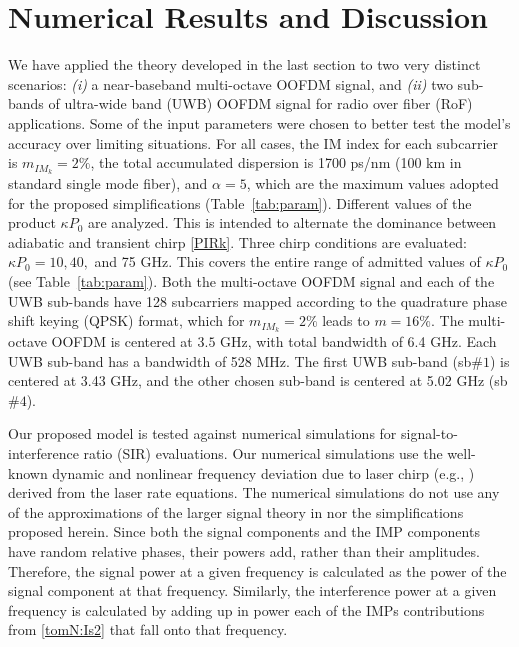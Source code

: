 \documentclass[journal]{IEEEtran}
\begin{document}
\section{Numerical Results and Discussion} \label{sec:results}
We have applied the theory developed in the last section to two very distinct scenarios: \emph{(i)} a near-baseband multi-octave OOFDM signal, and \emph{(ii)} two sub-bands of ultra-wide band (UWB) OOFDM signal for radio over fiber (RoF) applications. Some of the input parameters were chosen to better test the model's accuracy over limiting situations. For all cases, the IM index for each subcarrier is $m_{IM_k} = 2\%$, the total accumulated dispersion is 1700 ps/nm (100 km in standard single mode fiber), and $\alpha = 5$, which are the maximum values adopted for the proposed simplifications (Table~\ref{tab:param}). Different values of the product $\kappa P_0$ are analyzed. This is intended to alternate the dominance between adiabatic and transient chirp \eqref{PIRk}. Three chirp conditions are evaluated: $\kappa P_0 = 10, 40,$ and 75 GHz. This covers the entire range of admitted values of $\kappa P_0$ (see Table~\ref{tab:param}). Both the multi-octave OOFDM signal and each of the UWB sub-bands have 128 subcarriers mapped according to the quadrature phase shift keying (QPSK) format, which for $m_{IM_k} = 2\%$ leads to $m = 16\%$. The multi-octave OOFDM is centered at $3.5$ GHz, with total bandwidth of 6.4 GHz. Each UWB sub-band has a bandwidth of 528 MHz. The first UWB sub-band (sb$\#1$) is centered at 3.43 GHz, and the other chosen sub-band is centered at 5.02 GHz (sb$\#4$). 

Our proposed model is tested against numerical simulations for signal-to-interference ratio (SIR) evaluations. Our numerical simulations use the well-known dynamic and nonlinear frequency deviation due to laser chirp (e.g., \cite[eq. (3)]{equalization}) derived from the laser rate equations. The numerical simulations do not use any of the approximations of the larger signal theory in \cite{eva} nor the simplifications proposed herein. Since both the signal components and the IMP components have random relative phases, their powers add, rather than their amplitudes. Therefore, the signal power at a given frequency is calculated as the power of the signal component at that frequency. Similarly, the interference power at a given frequency is calculated by adding up in power each of the IMPs contributions from \eqref{tomN:Is2} that fall onto that frequency. 
\end{document}
